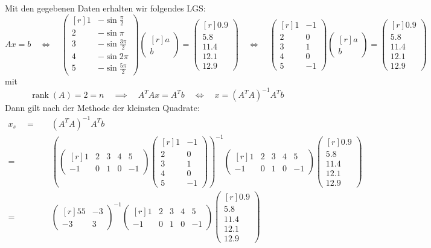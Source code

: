\documentclass[answers]{exam}
\newcommand{\vektor}[1]{\begin{pmatrix*}[r] #1 \end{pmatrix*}}
\DeclareMathOperator{\rank}{rank}
\begin{document}
\begin{questions}
\begin{solution}
        Mit den gegebenen Daten erhalten wir folgendes LGS:
        $$
            Ax = b \quad \iff \quad \vektor{1 & -\sin \frac{\pi}{2} \\ 2 & -\sin \pi \\ 3 & -\sin \frac{3\pi}{2} \\ 4 & -\sin 2 \pi \\ 5 & -\sin \frac{5\pi}{2}}\vektor{a \\ b} = \vektor{0.9 \\ 5.8 \\ 11.4 \\ 12.1 \\ 12.9} \quad \iff \quad \vektor{1 & -1 \\ 2 & 0 \\ 3 & 1 \\ 4 & 0 \\ 5 & -1}\vektor{a \\ b} = \vektor{0.9 \\ 5.8 \\ 11.4 \\ 12.1 \\ 12.9}
        $$
        mit
        $$
            \rank(A) = 2 = n \quad \implies \quad A^TAx = A^Tb \quad \iff \quad x = \left(A^T A\right)^{-1} A^T b
        $$
        Dann gilt nach der Methode der kleinsten Quadrate:
        $$
            \begin{aligned}
                x_s \quad = \quad & \left(A^T A\right)^{-1} A^T b                     \\
                = \quad           & \left(\vektor{1               & 2  & 3  & 4  & 5  \\ -1 & 0 & 1 & 0 & -1} \vektor{1 & -1 \\ 2 & 0 \\ 3 & 1 \\ 4 & 0 \\ 5 & -1}\right)^{-1} \vektor{1 & 2 & 3 & 4 & 5 \\ -1 & 0 & 1 & 0 & -1} \vektor{0.9 \\ 5.8 \\ 11.4 \\ 12.1 \\ 12.9} \\
                = \quad           & \vektor{55                    & -3                \\ -3 & 3}^{-1} \vektor{1 & 2 & 3 & 4 & 5 \\ -1 & 0 & 1 & 0 & -1} \vektor{0.9 \\ 5.8 \\ 11.4 \\ 12.1 \\ 12.9} \\

\end{aligned}$$
\end{solution}
\end{questions}
\end{document}
